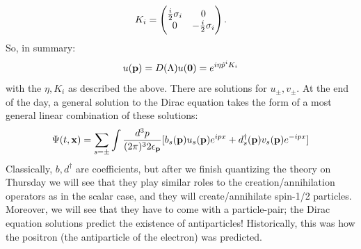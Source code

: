 \begin{equation}
    K_i = \begin{pmatrix}\frac{i}{2}\sigma_i & 0 \\ 0 & -\frac{i}{2}\sigma_i\end{pmatrix}.
\end{equation}
So, in summary:
\begin{equation}
    u(\mathbf{p}) = D(\Lambda)u(\mathbf{0}) = e^{i\eta \hat{p}^iK_i}
\end{equation}
with the $\eta, K_i$ as described the above. There are solutions for $u_\pm, v_\pm$. At the end of the day, a general solution to the Dirac equation takes the form of a most general linear combination of these solutions:
\begin{equation}
    \Psi(t, \mathbf{x}) = \sum_{s = \pm} \int \frac{d^3p}{(2\pi)^32\epsilon_{\mathbf{p}}}[b_s(\mathbf{p})u_s(\mathbf{p})e^{ipx} + d_s^\dagger(\mathbf{p})v_s(\mathbf{p})e^{-ipx}]
\end{equation}
Classically, $b, d^\dag$ are coefficients, but after we finish quantizing the theory on Thursday we will see that they play similar roles to the creation/annihilation operators as in the scalar case, and they will create/annihilate spin-1/2 particles. Moreover, we will see that they have to come with a particle-pair; the Dirac equation solutions predict the existence of antiparticles! Historically, this was how the positron (the antiparticle of the electron) was predicted.